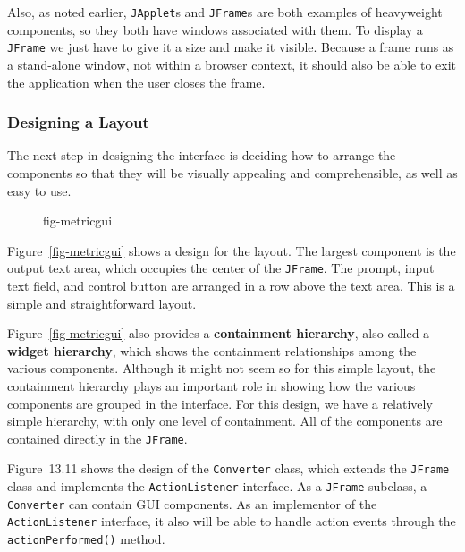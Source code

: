 Also, as noted earlier, {\tt JApplet}s and {\tt JFrame}s are both
examples of heavyweight components, so they both have windows
associated with them.  To display a {\tt JFrame} we just have to give
it a size and make it visible.  Because a frame runs as a stand-alone
window, not within a browser context, it should also be able to exit
the application when the user closes the frame.

\subsubsection*{Designing a Layout}
\noindent The next step in designing the interface is deciding how to arrange the
components so that they will be visually appealing and comprehensible,
as well as easy to use.
\begin{figure}[b]
 {fig-metricgui}

\end{figure}

Figure~\ref{fig-metricgui} shows a design for the layout. The largest
component is the output text area, which occupies the center of the
{\tt JFrame}. The prompt, input text field, and control button are
arranged in a row above the text area.  This is a simple and
straightforward layout.

Figure~\ref{fig-metricgui} also provides a {\bf containment
hierarchy}, also called a {\bf widget
hierarchy}, which shows the containment
relationships among the various components.  Although it might not
seem so for this simple layout, the containment hierarchy plays an
important role in showing how the various components are grouped
in the interface.  For this design, we have a relatively
simple hierarchy, with only one level of containment.  All of the
components are contained directly in the {\tt JFrame}.

\pagebreak
Figure~13.11 shows the design of the {\tt Converter} class, which
extends the {\tt JFrame} class and implements the {\tt ActionListener}
interface.  As a {\tt JFrame} subclass, a {\tt Converter} can contain
GUI components.  As an implementor of the {\tt ActionListener}
interface, it also will be able to handle action events through the {\tt
actionPerformed()} method.

